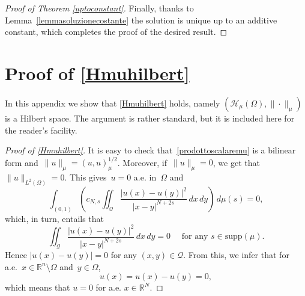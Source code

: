 \documentclass[12pt,a4paper,intlimits,sumlimits]{amsart}
\def \R {\mathbb{R}}
\def \Q {\mathcal Q}
\theoremstyle{definition}
\theoremstyle{plain}
\numberwithin{equation}{section}
\begin{document}
\begin{appendix}
\begin{proof}[Proof of Theorem \ref{uptoconstant}]
Finally, thanks to Lemma~\ref{lemmasoluzionecostante} the solution 
is unique up to an additive constant, which completes the proof of the desired result.
\end{proof}

\section{Proof of \eqref{Hmuhilbert}}\label{appendixHilbert}
In this appendix we show that \eqref{Hmuhilbert} holds, namely $(\mathcal{H}_\mu(\Omega), \|\cdot\|_{\mu})$ is a Hilbert space.
The argument is rather standard, but it is included here for the reader's facility.

\begin{proof}[Proof of \eqref{Hmuhilbert}]
It is easy to check that~\eqref{prodottoscalaremu} is a bilinear form and~$\|u\|_\mu = (u, u)^{1/2}_\mu$. Moreover, if~$\|u\|_\mu = 0$, we get that~$\|u\|_{L^2(\Omega)}=0$. This gives~$u=0$ a.e. in~$\Omega$ and
\[
\int_{(0,1)} \left(c_{N,s}\iint_\Q \frac{|u(x)-u(y)|^2}{|x-y|^{N+2s}}\,dx\,dy\right)\,d\mu(s) =0,
\]
which, in turn, entails that
\[
\iint_\Q \frac{|u(x)-u(y)|^2}{|x-y|^{N+2s}}\,dx\,dy =0 \quad\mbox{ for any } s\in\mbox{supp}(\mu).
\]
Hence $|u(x)-u(y)|=0$ for any $(x, y)\in\Q$.  {F}rom this, we infer that for a.e.~$x\in \R^n\setminus\Omega$ and~$y\in\Omega$,
\[
u(x) = u(x) -u(y)=0,
\]
which means that $u=0$ for a.e. $x\in\R^N$. 


\end{proof}
\end{appendix}
\end{document}
